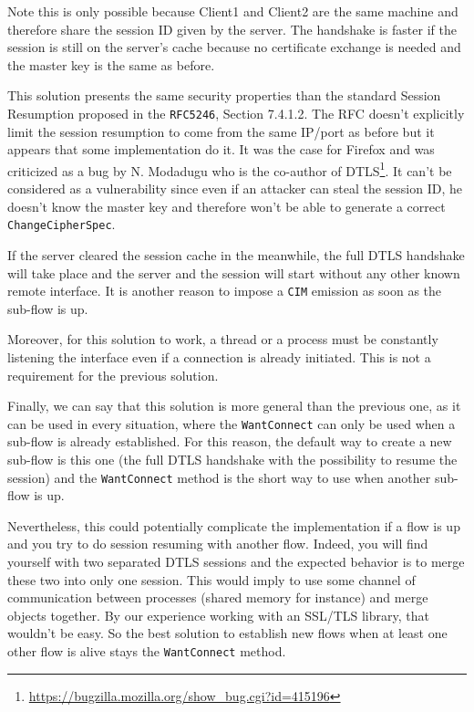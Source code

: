 Note this is only possible because Client1 and Client2 are the same machine and therefore share the session ID given by the server. The handshake is faster if the session is still on the server's cache because no certificate exchange is needed and the master key is the same as before.

This solution presents the same security properties than the standard Session Resumption proposed in the \texttt{RFC5246}\cite{rfc5246}, Section 7.4.1.2. The RFC doesn't explicitly limit the session resumption to come from the same IP/port as before but it appears that some implementation do it. It was the case for Firefox and was criticized as a bug by N. Modadugu who is the co-author of DTLS\footnote{\url{https://bugzilla.mozilla.org/show_bug.cgi?id=415196}}. It can't be considered as a vulnerability since even if an attacker can steal the session ID, he doesn't know the master key and therefore won't be able to generate a correct \texttt{ChangeCipherSpec}.

If the server cleared the session cache in the meanwhile, the full DTLS handshake will take place and the server and the session will start without any other known remote interface. It is another reason to impose a \texttt{CIM} emission as soon as the sub-flow is up.

Moreover, for this solution to work, a thread or a process must be constantly listening the interface even if a connection is already initiated. This is not a requirement for the previous solution.

Finally, we can say that this solution is more general than the previous one, as it can be used in every situation, where the \texttt{WantConnect} can only be used when a sub-flow is already established. For this reason, the default way to create a new sub-flow is this one (the full DTLS handshake with the possibility to resume the session) and the \texttt{WantConnect} method is the short way to use when another sub-flow is up.

Nevertheless, this could potentially complicate the implementation if a flow is up and you try to do session resuming with another flow. Indeed, you will find yourself with two separated DTLS sessions and the expected behavior is to merge these two into only one session. This would imply to use some channel of communication between processes (shared memory for instance) and merge objects together. By our experience working with an SSL/TLS library, that wouldn't be easy. So the best solution to establish new flows when at least one other flow is alive stays the \texttt{WantConnect} method.

